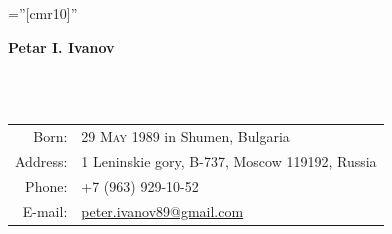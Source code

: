 \documentclass[a4paper,10pt]{article}
\def\name{Petar I. Ivanov}
\newcommand{\minorcolor}[1]{\textcolor{mygray}{#1}}
\begin{document}
\pagestyle{empty}				%
\font\fb=''[cmr10]''				%

\begin{figure}
	\setlength\fboxsep{0pt}
	\setlength\fboxrule{0.1pt}
	\vspace{-20pt}
\end{figure}

\par{\raggedright\Huge\textbf{\vspace{-3mm}\hspace{0mm}\name}}\\		%
\vspace{-5mm}{\color{linegray}\rule{10.5cm}{0.1mm}}\\

\hspace{4mm}\begin{tabular}{rl}
	\minorcolor{Born:} & \textsc{29 May 1989} in Shumen, Bulgaria\\
	\minorcolor{Address:} & \textsc{1} Leninskie gory, B-737, Moscow \textsc{119192}, Russia\\
	\minorcolor{Phone:} & \textsc{+7 (963) 929-10-52}\\
	\minorcolor{E-mail:} & \href{mailto:peter.ivanov89@gmail.com}{peter.ivanov89@gmail.com}\\
\end{tabular}
\bigskip

\end{document}
